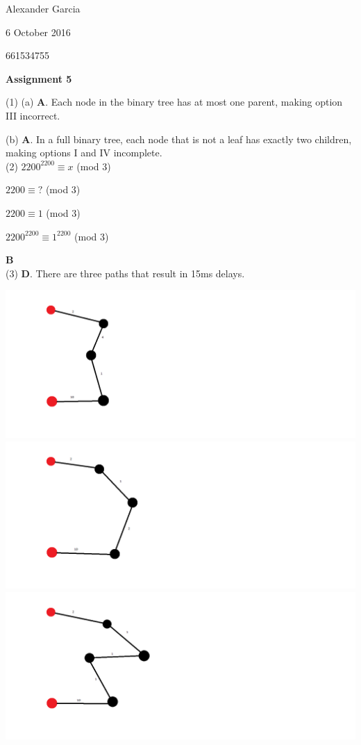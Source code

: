 \documentclass[]{article}
\begin{document}
Alexander Garcia

6 October 2016

661534755

\centerline{\bf \Large Assignment 5}

\medskip

\noindent (1) (a) \textbf{A}. Each node in the binary tree has at most one parent, making option III incorrect.

(b) \textbf{A}. In a full binary tree, each node that is not a leaf has exactly two children, making options I and IV incomplete. \\

\noindent (2) $2200^{2200} \equiv x$ (mod 3)

$2200 \equiv ?$ (mod 3)

$2200 \equiv 1$ (mod 3)

$2200^{2200} \equiv 1^{2200}$ (mod 3)

\textbf{B} \\

\noindent (3) \textbf{D}. There are three paths that result in 15ms delays.

\includegraphics[scale=0.2]{path1.png}
\includegraphics[scale=0.2]{path2.png}
\includegraphics[scale=0.2]{path3.png}\\
\end{document}
